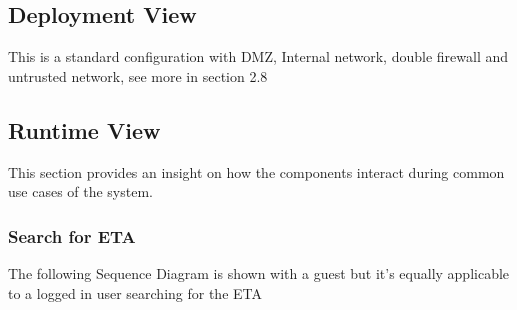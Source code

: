 \documentclass{article}
\begin{document}
	\subsection{Deployment View}
	\begin{figure}[H]
	\end{figure}
	This is a standard configuration with DMZ, Internal network, double firewall and untrusted network, see more in section 2.8
	\subsection{Runtime View}
	This section provides an insight on how the components interact during common use cases of the system.
	\subsubsection{Search for ETA}
	The following Sequence Diagram is shown with a guest but it's equally applicable to a logged in user searching for the ETA\footnotemark\ 
	\begin{figure}[H]
	\end{figure}
\end{document}
